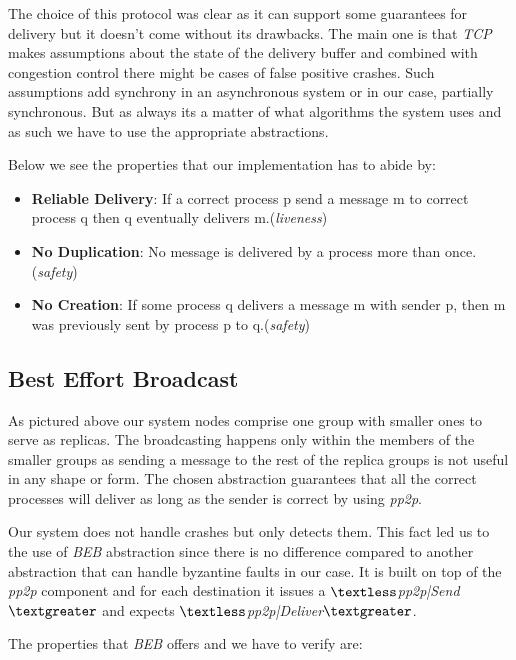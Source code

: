\documentclass[a4paper, 11pt]{article}
\begin{document}
The choice of this protocol was clear as it can support some guarantees for delivery but it doesn't come without its drawbacks. The main one is that \textit{TCP} makes assumptions about the state of the delivery buffer and combined with congestion control there might be cases of false positive crashes. Such assumptions add synchrony in an asynchronous system or in our case, partially synchronous. But as always its a matter of what algorithms the system uses and as such we have to use the appropriate abstractions. \par 

Below we see the properties that our implementation has to abide by:
\begin{itemize}
	\item \textbf{Reliable Delivery}: If a correct process p send a message m to correct process q then q eventually delivers m.(\textit{liveness})
	\item \textbf{No Duplication}: No message is delivered by a process more than once.(\textit{safety})
	\item \textbf{No Creation}: If some process q delivers a message m with sender p, then m was previously sent by process p to q.(\textit{safety})
\end{itemize}

\subsection{Best Effort Broadcast}

As pictured above our system nodes comprise one group with smaller ones to serve as replicas. The broadcasting happens only within the members of the smaller groups as sending a message to the rest of the replica groups is not useful in any shape or form. The chosen abstraction guarantees that all the correct processes will deliver as long as the sender is correct by using \textit{pp2p}. \par

Our system does not handle crashes but only detects them. This fact led us to the use of \textit{BEB} abstraction since there is no difference compared to another abstraction that can handle byzantine faults in our case. It is built on top of the \textit{pp2p} component and for each destination it issues a \textit{$\textless$pp2p|Send$\textgreater$} and expects \textit{$\textless$pp2p|Deliver$\textgreater$}. \par

The properties that \textit{BEB} offers and we have to verify are:
\end{document}
